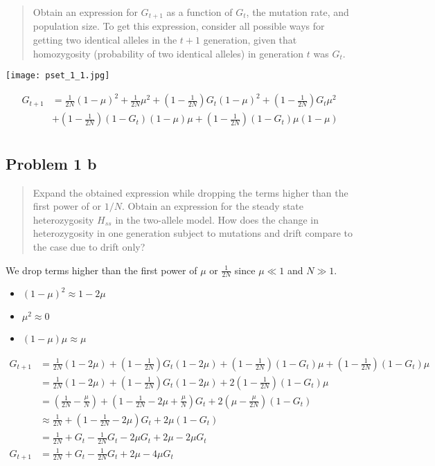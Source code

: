 \documentclass[
  letterpaper,
  DIV=11,
  numbers=noendperiod]{scrartcl}
\providecommand{\tightlist}{%
  \setlength{\itemsep}{0pt}\setlength{\parskip}{0pt}}\usepackage{longtable,booktabs,array}
\begin{document}
\begin{quote}
Obtain an expression for \(G_{t+1}\) as a function of \(G_t\), the
mutation rate, and population size. To get this expression, consider all
possible ways for getting two identical alleles in the \(t+1\)
generation, given that homozygosity (probability of two identical
alleles) in generation \(t\) was \(G_t\).
\end{quote}

\texttt{[image: pset\_1\_1.jpg]}

\[
\begin{aligned}
G_{t+1}&=\frac{1}{2N}(1-\mu)^2+\frac{1}{2N}\mu^2+\left(1-\frac{1}{2N}\right)G_{t}(1-\mu)^2+\left(1-\frac{1}{2N}\right)G_{t}\mu^2\\
&+\left(1-\frac{1}{2N}\right)(1-G_t)(1-\mu)\mu+\left(1-\frac{1}{2N}\right)(1-G_t)\mu(1-\mu)\\
\end{aligned}
\]

\hypertarget{problem-1-b}{%
\subsection{Problem 1 b}\label{problem-1-b}}

\begin{quote}
Expand the obtained expression while dropping the terms higher than the
first power of or \(1/N\). Obtain an expression for the steady state
heterozygosity \(H_{ss}\) in the two-allele model. How does the change
in heterozygosity in one generation subject to mutations and drift
compare to the case due to drift only?
\end{quote}

We drop terms higher than the first power of \(\mu\) or \(\frac{1}{2N}\)
since \(\mu \ll 1\) and \(N \gg 1\).

\begin{itemize}
\tightlist
\item
  \((1-\mu)^2 \approx 1-2\mu\)
\item
  \(\mu^2 \approx 0\)
\item
  \((1-\mu)\mu \approx \mu\)
\end{itemize}

\[
\begin{aligned}
G_{t+1}&=\frac{1}{2N}(1-2\mu)+\left(1-\frac{1}{2N}\right)G_{t}(1-2\mu)+\left(1-\frac{1}{2N}\right)(1-G_t)\mu+\left(1-\frac{1}{2N}\right)(1-G_t)\mu\\
&=\frac{1}{2N}(1-2\mu)+\left(1-\frac{1}{2N}\right)G_{t}(1-2\mu)+2\left(1-\frac{1}{2N}\right)(1-G_t)\mu\\
&= \left(\frac{1}{2N}-\frac{\mu}{N}\right)+\left(1-\frac{1}{2N}-2\mu + \frac{\mu}{N}\right)G_{t}+2\left(\mu-\frac{\mu}{2N}\right)(1-G_t)\\
&\approx \frac{1}{2N}+\left(1-\frac{1}{2N}-2\mu \right)G_{t}+2\mu(1-G_t)\\
&= \frac{1}{2N}+G_{t}-\frac{1}{2N}G_{t}-2\mu G_{t}+2\mu-2\mu G_t\\
G_{t+1}&= \frac{1}{2N}+G_{t}-\frac{1}{2N}G_{t}+2\mu-4\mu G_t\\
\end{aligned}
\]
\end{document}
